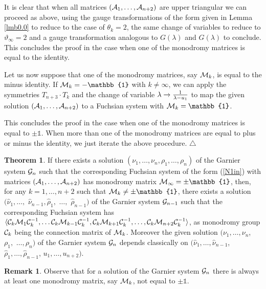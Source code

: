 \documentclass[12pt]{article}
\def\thi{{\vartheta_\infty}}
\newcommand{\ID}{\mathbb{1}}
\theoremstyle{definition}
\newtheorem{rmk}[df]{Remark}
\theoremstyle{theorem}
\newtheorem{thm}[df]{Theorem}
\begin{document}

It is clear that when all matrices $({\cal A}_1,\dots,{\cal A}_{n+2})$ 
are upper triangular we can proceed as above, using the gauge 
transformations of the form given in Lemma \ref{lmb0.0} to reduce 
to the case of $\theta_k=2$, the same change of variables to
reduce to $\thi=2$ and a gauge transformation analogous to
$G(\lambda)$ and $\hat G(\lambda)$ to conclude. This concludes the 
proof in the case when one of the monodromy matrices is equal to 
the identity. 

Let us now suppose that one of the monodromy matrices, 
say ${\cal M}_k$, is equal to the minus identity. 
If ${\cal M}_k=-\ID$ with $k\neq\infty$, we can apply
the symmetries $T_{n+3}\cdot T_{k}$ and the change of variable
$\lambda\to {1\over\lambda-u_1}$ to map the given solution  
$({\cal A}_1,\dots,{\cal A}_{n+2})$ to a Fuchsian system with 
${\cal M}_k=\ID$. 

This concludes the proof in the case when one of the 
monodromy matrices is equal to $\pm\ID$. When more than one 
of the monodromy matrices are equal to plus or
minus the identity, we just iterate the above procedure. 
{\hfill$\bigtriangleup$}



\begin{thm}
If there exists a solution $(\nu_1,\dots,\nu_n,\rho_1,\dots,\rho_n)$
of the Garnier system ${\cal G}_{n}$ such that the corresponding 
Fuchsian system of the form (\ref{N1in}) with matrices 
$({\cal A}_1,\dots,{\cal A}_{n+2})$ has monodromy matrix 
${\cal M}_\infty=\pm\ID$, then, for any $k=1,\dots,n+2$ such
that ${\cal M}_k\neq\pm\ID$, there exists a solution $(\hat\nu_1,
\dots,$ $\hat\nu_{n-1},\hat\rho_1,$ $\dots,$ $\hat\rho_{n-1})$
of the Garnier system ${\cal G}_{n-1}$ such that the corresponding
Fuchsian system  has
$\langle {\cal C}_k{\cal M}_1{\cal C}_k^{-1},\dots
{\cal C}_k{\cal M}_{k-1}{\cal C}_k^{-1},
{\cal C}_k{\cal M}_{k+1}{\cal C}_k^{-1},
\dots,{\cal C}_k{\cal M}_{n+2}{\cal C}_k^{-1}\rangle$, as monodromy group 
${\cal C}_k$ being the connection matrix of ${\cal M}_k$.
Moreover the given solution $(\nu_1,\dots,\nu_n$, $\rho_1,$ $\dots,\rho_n)$
of the Garnier system ${\cal G}_{n}$ depends classically on 
$(\hat\nu_1,\dots,\hat\nu_{n-1}$, $\hat\rho_1,
\dots,\hat\rho_{n-1}$, $u_1,\dots,u_{n+2})$. 
\label{mainthmsm1}\end{thm}

\begin{rmk}
Observe that for a solution of the Garnier system ${\cal G}_{n}$
there is always at least one monodromy matrix, say ${\cal M}_k$,
not equal to $\pm\ID$. 
\label{mdiag}\end{rmk}
\end{document}
